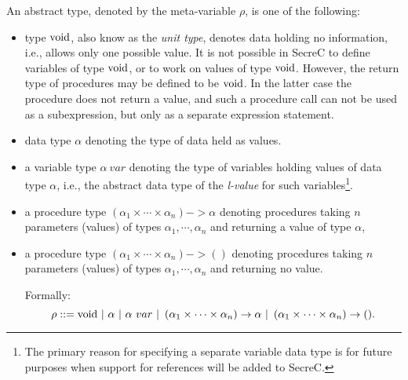 \documentclass[a4paper, 10pt, draft]{report}
\newcommand{\mycode}[1]{\ensuremath{\mbox{\lstinline{#1}}}}
\begin{document}
An abstract type, denoted by the meta-variable $\rho$, is one of the following:
\begin{itemize}
  \item
    type $\mycode{void}$, also know as the \textit{unit type}, denotes data
    holding no information, i.e., allows only one possible value. It is not
    possible in SecreC to define variables of type \mycode{void}, or to work on
    values of type \mycode{void}. However, the return type of procedures may be
    defined to be \mycode{void}. In the latter case the procedure does not
    return a value, and such a procedure call can not be used as a
    subexpression, but only as a separate expression statement.

  \item data type $\alpha$ denoting the type of data held as values.

  \item  a variable type $\alpha\ var$ denoting the type of variables holding
    values of data type $\alpha$, i.e., the abstract data type of the
    \textit{l-value} for such variables\footnote{The primary reason for
    specifying a separate variable data type is for future purposes when
    support for references will be added to SecreC.}.

  \item a procedure type $\left(\alpha_1 \times \cdots \times \alpha_n\right)
    -> \alpha$ denoting procedures taking $n$ parameters (values) of types
    $\alpha_1,\cdots,\alpha_n$ and returning a value of type $\alpha$,

  \item a procedure type $\left(\alpha_1 \times \cdots \times \alpha_n\right) ->
    ()$ denoting procedures taking $n$ parameters (values) of types
    $\alpha_1,\cdots,\alpha_n$ and returning no value.

Formally:
\[
  \rho ::= \mycode{void}\ |\ \alpha\ |\ \alpha\ var\ |\  \left(\alpha_1 \times \cdots \times \alpha_n\right) -> \alpha\ |\ \left(\alpha_1 \times \cdots \times \alpha_n\right) -> ().
\]

\end{itemize}
\end{document}
